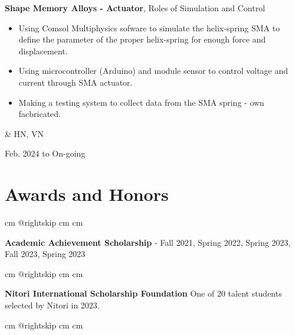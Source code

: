 \documentclass[10pt, letterpaper]{article}
\newenvironment{highlights}{
        \begin{itemize}[
                topsep=0pt,
                parsep=0.10 cm,
                partopsep=0pt,
                itemsep=0pt,
                after=\vspace{-1\baselineskip},
                leftmargin=0.4 cm + 3pt
            ]
    }{
        \end{itemize}
    } %
\let\originalTabularx\tabularx
\let\originalEndTabularx\endtabularx
\renewenvironment{tabularx}{\bgroup\centering\originalTabularx}{\originalEndTabularx\par\egroup}
\begin{document}
        \vspace{0.2 cm}
        \begin{tabularx}{
            \textwidth-0.4 cm-0.13cm
        }{
            K{0.2 cm}
            R{4.1 cm}
        }
            \textbf{Shape Memory Alloys - Actuator}, Roles of Simulation and Control

            \vspace{0.10 cm}

            \begin{highlights}
                \item Using Comsol Multiphysics sofware to simulate the helix-spring SMA to define the 
                parameter of the proper helix-spring for enough force and displacement.
                \item Using microcontroller (Arduino) and module sensor to control voltage and current through SMA actuator.
                \item Making a testing system to collect data from the SMA spring - own facbricated.
            \end{highlights}
            &
            HN, VN

            Feb. 2024 to On-going
        \end{tabularx}

        \vspace{0.2 cm}

        
    \section{Awards and Honors}

        \begingroup{} cm
        \advance\csname @rightskip cm
        \advance{} cm

        \textbf{Academic Achievement Scholarship} - Fall 2021, Spring 2022, Spring 2023, Fall 2023, Spring 2023  \par\endgroup

        \vspace{0.2 cm}
        \begingroup{} cm
        \advance\csname @rightskip cm
        \advance{} cm

        \textbf{Nitori International Scholarship Foundation} One of 20 talent students selected by Nitori in 2023. \par\endgroup

        \vspace{0.2 cm}
        \begingroup{} cm
        \advance\csname @rightskip cm
        \advance{} cm
\end{document}
